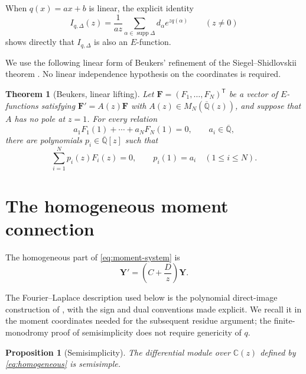 \documentclass[11pt]{article}
\numberwithin{equation}{section}
\newtheorem{theorem}{Theorem}[section]
\newtheorem{proposition}[proposition]{Proposition}
\theoremstyle{definition}
\theoremstyle{remark}
\newcommand{\C}{\mathbb C}
\newcommand{\Qbar}{\overline{\mathbb Q}}
\newcommand{\supp}{\operatorname{supp}}
\begin{document}
When $q(x)=ax+b$ is linear, the explicit identity
\begin{equation}\label{eq:linear-formula}
  I_{q,\Delta}(z)
  =\frac1{az}\sum_{\alpha\in\supp\Delta}
       d_\alpha e^{zq(\alpha)}
  \qquad(z\ne0)
\end{equation}
shows directly that $I_{q,\Delta}$ is also an $E$-function.

We use the following linear form of Beukers' refinement of the
Siegel--Shidlovskii theorem
\cite[Theorem~3.2 and Lemma~3.1]{Beukers}.  No linear independence
hypothesis on the coordinates is required.

\begin{theorem}[Beukers, linear lifting]\label{thm:Beukers}
Let $\mathbf F=(F_1,\ldots,F_N)^{\mathsf T}$ be a vector of $E$-functions
satisfying $\mathbf F'=A(z)\mathbf F$ with
$A(z)\in M_N(\Qbar(z))$, and suppose that $A$ has no pole at $z=1$.
For every relation
\[
  a_1F_1(1)+\cdots+a_NF_N(1)=0,
  \qquad a_i\in\Qbar,
\]
there are polynomials $p_i\in\Qbar[z]$ such that
\[
  \sum_{i=1}^N p_i(z)F_i(z)=0,
  \qquad p_i(1)=a_i\quad(1\le i\le N).
\]
\end{theorem}

\section{The homogeneous moment connection}

The homogeneous part of \eqref{eq:moment-system} is
\begin{equation}\label{eq:homogeneous}
  \mathbf Y'=\left(C+\frac Dz\right)\mathbf Y.
\end{equation}

The Fourier--Laplace description used below is the polynomial direct-image
construction of \cite[Proposition~5.1]{FresanJossen}, with the sign and dual
conventions made explicit.  We recall it in the moment coordinates needed
for the subsequent residue argument; the finite-monodromy proof of
semisimplicity does not require genericity of $q$.

\begin{proposition}[Semisimplicity]\label{prop:semisimplicity}
The differential module over $\C(z)$ defined by
\eqref{eq:homogeneous} is semisimple.
\end{proposition}
\end{document}

